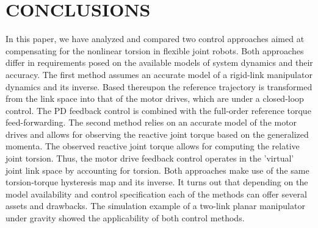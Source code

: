 \documentclass[a4paper, 10pt, conference]{ieeeconf}
\begin{document}
\section{CONCLUSIONS}
\label{sec:6}


In this paper, we have analyzed and compared two control
approaches aimed at compensating for the nonlinear torsion in
flexible joint robots. Both approaches differ in requirements
posed on the available models of system dynamics and their
accuracy. The first method assumes an accurate model of a
rigid-link manipulator dynamics and its inverse. Based thereupon
the reference trajectory is transformed from the link space into
that of the motor drives, which are under a closed-loop control.
The PD feedback control is combined with the full-order reference
torque feed-forwarding. The second method relies on an accurate
model of the motor drives and allows for observing the reactive
joint torque based on the generalized momenta. The observed
reactive joint torque allows for computing the relative joint
torsion. Thus, the motor drive feedback control operates in the
'virtual' joint link space by accounting for torsion. Both
approaches make use of the same torsion-torque hysteresis map and
its inverse. It turns out that depending on the model availability
and control specification each of the methods can offer several
assets and drawbacks. The simulation example of a two-link planar
manipulator under gravity showed the applicability of both control
methods.









\end{document}
